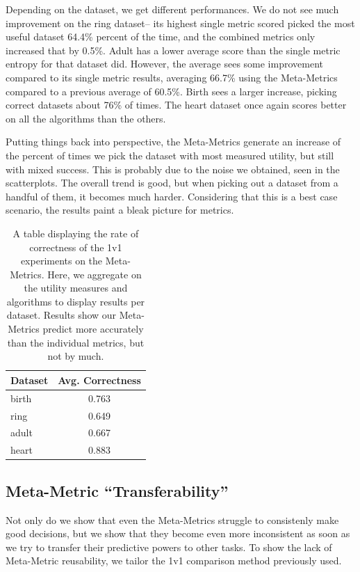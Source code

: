 Depending on the dataset, we get different performances. We do not see much improvement on the ring dataset-- its highest single metric scored picked the most useful dataset 64.4\% percent of the time, and the combined metrics only increased that by 0.5\%. Adult has a lower average score than the single metric entropy for that dataset did. However, the average sees some improvement compared to its single metric results, averaging 66.7\% using the Meta-Metrics compared to a previous average of 60.5\%. Birth sees a larger increase, picking correct datasets about 76\% of times. The heart dataset once again scores better on all the algorithms than the others.

Putting things back into perspective, the Meta-Metrics generate an increase of the percent of times we pick the dataset with most measured utility, but still with mixed success. This is probably due to the noise we obtained, seen in the scatterplots. The overall trend is good, but when picking out a dataset from a handful of them, it becomes much harder. Considering that this is a best case scenario, the results paint a bleak picture for metrics.

\begin{table}[h]
\begin{tabular}{|l|c|}
\hline
\rowcolor{gray!50}
\cellcolor{gray!50} Dataset & Avg. Correctness  \\
\hline
\cellcolor{gray!50} birth   & 0.763 \\
\cellcolor{gray!50} ring    & 0.649 \\
\cellcolor{gray!50} adult   & 0.667 \\
\cellcolor{gray!50} heart   & 0.883 \\
\hline
\end{tabular}
\centering
\caption{A table displaying the rate of correctness of the 1v1 experiments on the Meta-Metrics. Here, we aggregate on the utility measures and algorithms to display results per dataset. Results show our Meta-Metrics predict more accurately than the individual metrics, but not by much.}
\label{tab:1v1_meta}
\end{table}




\subsection{Meta-Metric ``Transferability''}
Not only do we show that even the Meta-Metrics struggle to consistenly make good decisions, but we show that they become even more inconsistent as soon as we try to transfer their predictive powers to other tasks. To show the lack of Meta-Metric reusability, we tailor the 1v1 comparison method previously used. 

